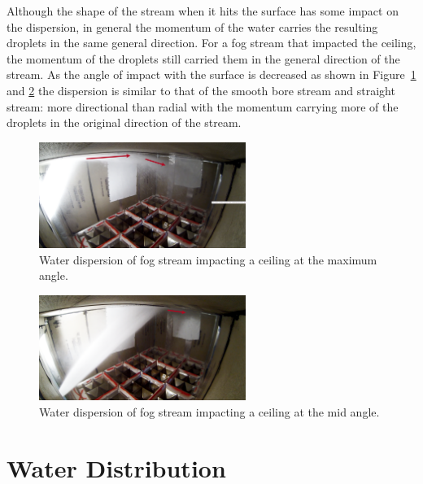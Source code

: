 \documentclass[12pt,oneside]{book}
\begin{document}
Although the shape of the stream when it hits the surface has some impact on the dispersion, in general the momentum of the water carries the resulting droplets in the same general direction. For a fog stream that impacted the ceiling, the momentum of the droplets still carried them in the general direction of the stream. As the angle of impact with the surface is decreased as shown in Figure~\ref{fig:MaxAngleCeilingFogImpact} and \ref{fig:MinAngleCeilingFogImpact} the dispersion is similar to that of the smooth bore stream and straight stream: more directional than radial with the momentum carrying more of the droplets in the original direction of the stream.

\begin{figure}[!ht]
\centering
\includegraphics[width=0.6\textwidth]{Figures/Water_Distribution/Nozzle_Directions/Interior_MaxAngleCeiling_Fog_Arrows}
\caption[Water Dispersion Fog Stream Maximum Angle Ceiling]{Water dispersion of fog stream impacting a ceiling at the maximum angle.}
\label{fig:MaxAngleCeilingFogImpact}
\end{figure}

\begin{figure}[!ht]
\centering
\includegraphics[width=0.6\textwidth]{Figures/Water_Distribution/Nozzle_Directions/Interior_MidCeiling_Fog_Arrows} 
\caption[Water Dispersion Fog Stream Mid Angle Ceiling]{Water dispersion of fog stream impacting a ceiling at the mid angle.}
\label{fig:MinAngleCeilingFogImpact}
\end{figure}


\section{Water Distribution}
\label{sec:water_dist}
\end{document}

